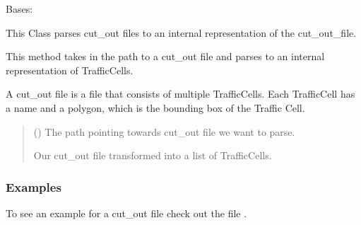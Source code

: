 \documentclass[letterpaper,10pt,english]{sphinxmanual}
\begin{document}
\begin{fulllineitems}
\label{\detokenize{apidoc/src.osm_configurator.model.parser:src.osm_configurator.model.parser.cutOut_parser_interface.CutOutParserInterface}}
\pysigstartsignatures
{}
\pysigstopsignatures
\sphinxAtStartPar
Bases: 

\sphinxAtStartPar
This Class parses cut\_out files to an internal representation of the cut\_out\_file.

\begin{fulllineitems}
\label{\detokenize{apidoc/src.osm_configurator.model.parser:src.osm_configurator.model.parser.cutOut_parser_interface.CutOutParserInterface.parse_cutout_file}}
\pysigstartsignatures
{}
\pysigstopsignatures
\sphinxAtStartPar
This method takes in the path to a cut\_out file and parses to an
internal representation of TrafficCells.

\sphinxAtStartPar
A cut\_out file is a  file that consists of multiple TrafficCells. Each TrafficCell has
a name and a polygon, which is the bounding box of the Traffic Cell.
\begin{quote}\begin{description}
\sphinxAtStartPar
{} () \textendash{} The path pointing towards cut\_out file we want to parse.

\sphinxAtStartPar
Our cut\_out file transformed into a list of TrafficCells.

\sphinxAtStartPar
{}

\end{description}\end{quote}
\subsubsection*{Examples}

\sphinxAtStartPar
To see an example for a cut\_out file check out the file .

\end{fulllineitems}


\end{fulllineitems}
\end{document}
